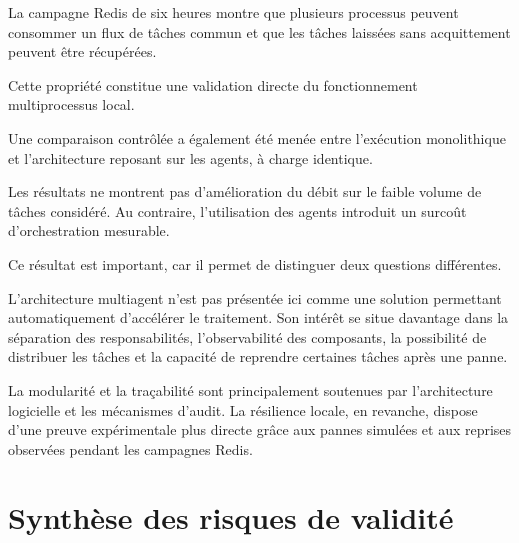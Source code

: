 La campagne Redis de six heures montre que plusieurs processus peuvent consommer un flux de tâches commun et que les tâches laissées sans acquittement peuvent être récupérées.

Cette propriété constitue une validation directe du fonctionnement multiprocessus local.

Une comparaison contrôlée a également été menée entre l'exécution monolithique et l'architecture reposant sur les agents, à charge identique.

Les résultats ne montrent pas d'amélioration du débit sur le faible volume de tâches considéré. Au contraire, l'utilisation des agents introduit un surcoût d'orchestration mesurable.

Ce résultat est important, car il permet de distinguer deux questions différentes.

L'architecture multiagent n'est pas présentée ici comme une solution permettant automatiquement d'accélérer le traitement. Son intérêt se situe davantage dans la séparation des responsabilités, l'observabilité des composants, la possibilité de distribuer les tâches et la capacité de reprendre certaines tâches après une panne.

La modularité et la traçabilité sont principalement soutenues par l'architecture logicielle et les mécanismes d'audit. La résilience locale, en revanche, dispose d'une preuve expérimentale plus directe grâce aux pannes simulées et aux reprises observées pendant les campagnes Redis.

\section{Synthèse des risques de validité}


